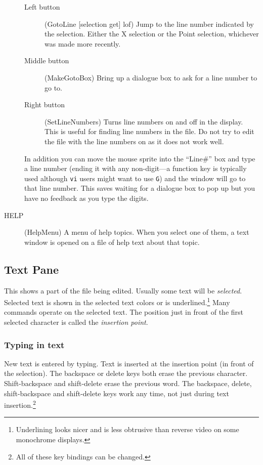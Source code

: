 \begin{description}
\begin{description}
	\item[Left button] (GotoLine [selection get] lof)
		Jump to the line number indicated by the selection.
		Either the X selection or
		the Point selection, whichever was made more recently.

	\item[Middle button] (MakeGotoBox) Bring up a dialogue box
		to ask for a line number to go to.

	\item[Right button] (SetLineNumbers) Turns line numbers on and off
		in the display.  This is useful for finding line
		numbers in the file.  Do not try to edit the file with
		the line numbers on as it does not work well.

	\end{description}

	In addition you can move the mouse sprite into the ``Line\#'' box and
	type a line number
	(ending it with any non-digit---a function key is typically used
	although {\tt vi} users might want to use {\tt G})
	and the window will go to that line number.
	This saves waiting for a dialogue box to pop up but you have no
	feedback as you type the digits.

\item[HELP] (HelpMenu) A menu of help topics.
	When you select one of them, a text window is opened on a file
	of help text about that topic.

\end{description}



\subsection{Text Pane}

This shows a part of the file being edited.
Usually some text will be {\it selected}.
Selected text is shown in the selected text colors or is underlined.\footnote{
Underlining looks nicer and is less obtrusive
than reverse video on some monochrome displays.}
Many commands operate on the selected text.
The position just in front of the first selected
character is called the {\it insertion point}.

\subsubsection{Typing in text}

New text is entered by typing.
Text is inserted at the insertion point (in front of the selection).
The backspace or delete keys both erase the previous character.
Shift-backspace and shift-delete erase the previous word.
The backspace, delete, shift-backspace and shift-delete keys
work any time, not just during text insertion.\footnote{
	All of these key bindings can be changed.}

